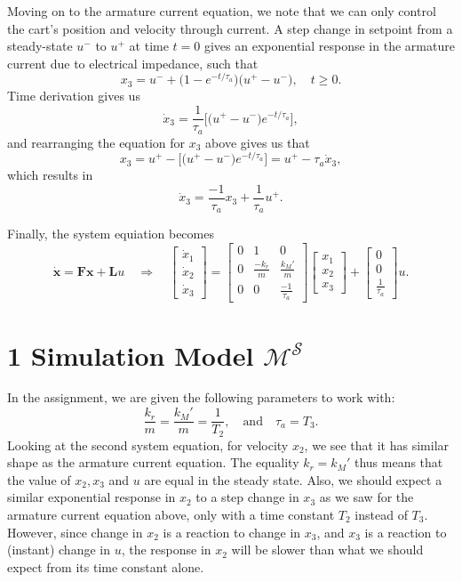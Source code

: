 \documentclass[11pt]{article}
\begin{document}
Moving on to the armature current equation, we note that we can only
control the cart's position and velocity through current. A step change
in setpoint from a steady-state \(u^-\) to \(u^+\) at time \(t=0\) gives
an exponential response in the armature current due to electrical
impedance, such that \[
x_3 = u^- + \big( 1 - e^{-t/\tau_a} \big) \big( u^+ - u^- \big), \quad t \ge 0.
\] Time derivation gives us \[
\dot{x}_3 = \frac{1}{\tau_a} \bigg[ \big( u^+ - u^- \big)e^{-t/\tau_a} \bigg],
\] and rearranging the equation for \(x_3\) above gives us that \[
x_3 = u^+ - \bigg[ \big( u^+ - u^- \big)e^{-t/\tau_a} \bigg] = u^+ - \tau_a \dot{x}_3,
\] which results in \[
\dot{x}_3 = \frac{-1}{\tau_a} x_3 + \frac{1}{\tau_a} u^+.
\]

Finally, the system equiation becomes \[
\dot{\mathbf{x}} = \mathbf{F}\mathbf{x} + \mathbf{L}u
\quad \Rightarrow \quad
\begin{bmatrix}
\dot{x}_1 \\ \dot{x}_2 \\ \dot{x}_3
\end{bmatrix}
=
\begin{bmatrix}
0 & 1 & 0 \\
0 & \frac{-k_r}{m} & \frac{k_M'}{m} \\
0 & 0 & \frac{-1}{\tau_a}
\end{bmatrix}
\begin{bmatrix}
x_1 \\ x_2 \\ x_3
\end{bmatrix}
+
\begin{bmatrix}
0 \\ 0 \\ \frac{1}{\tau_a}
\end{bmatrix}
u.
\]

    \hypertarget{simulation-model-mathcalms}{%
\section*{\texorpdfstring{1 Simulation Model
\(\mathcal{M^S}\)}{1 Simulation Model \textbackslash mathcal\{M\^{}S\}}}\label{simulation-model-mathcalms}}

    In the assignment, we are given the following parameters to work with:
\[
\frac{k_r}{m} = \frac{k_M'}{m} = \frac{1}{T_2}, \quad \text{and} \quad \tau_a = T_3.
\] Looking at the second system equation, for velocity \(x_2\), we see
that it has similar shape as the armature current equation. The equality
\(k_r = k_M'\) thus means that the value of \(x_2, x_3\) and \(u\) are
equal in the steady state. Also, we should expect a similar exponential
response in \(x_2\) to a step change in \(x_3\) as we saw for the
armature current equation above, only with a time constant \(T_2\)
instead of \(T_3\). However, since change in \(x_2\) is a reaction to
change in \(x_3\), and \(x_3\) is a reaction to (instant) change in
\(u\), the response in \(x_2\) will be slower than what we should expect
from its time constant alone.
\end{document}
